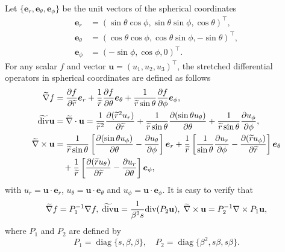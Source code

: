 \documentclass[11pt]{article}
\newcommand{\pa}{\partial}
\newcommand{\dive}{{\rm div}}
\newcommand{\wid}{\widetilde}
\newcommand{\bs}{\boldsymbol}
\providecommand{\Diag}{\operatorname{diag}}%
\begin{document}
Let $\{\bs e_r,\bs e_{\theta},\bs e_{\phi}\}$ be the unit vectors of the spherical coordinates
\begin{equation*}
\begin{aligned}
\bs{e}_{r} &=(\sin \theta \cos \phi, \sin \theta \sin \phi, \cos \theta)^\top, \\ 
\bs{e}_{\theta} &=(\cos \theta \cos \phi, \cos \theta \sin \phi,-\sin \theta)^\top, \\ 
\bs{e}_{\phi} &=(-\sin \phi, \cos \phi, 0)^\top.
\end{aligned}
\end{equation*}
For any scalar $f$ and vector $\mathbf{u}=(u_1,u_2,u_3)^{\top}$, the stretched differential 
operators in spherical coordinates are defined as follows
\begin{equation*}
\begin{aligned}
\wid{\nabla}f &=\frac{\pa f}{\pa \wid{r} }\bs{e}_r+\frac{1}{\wid{r}}\frac{\pa f}{\pa \theta }
\bs{e}_{\theta}+\frac{1}{\wid{r}\sin \theta}\frac{\pa f}{\pa \phi }\bs{e}_{\phi},\\
\wid{\dive}\mathbf{u} &=\wid{\nabla}\cdot\mathbf{u}=\frac{1}{\wid{r}^2}\frac{\pa(\wid{r}^2 u_r)}
{\pa \wid{r} }+\frac{1}{\wid{r}\sin\theta}\frac{\pa(\sin\theta u_{\theta})}{\pa \theta }
+\frac{1}{\wid{r}\sin \theta}\frac{\pa u_{\phi}}{\pa \phi },\\
\wid{\nabla}\times\mathbf{u} &=\frac{1}{ \wid{r}\sin\theta }\left[\frac{\pa(\sin\theta u_{\phi})}
{\pa \theta}-\frac{\pa u_{\theta}}{\pa \phi}\right]\bs{e}_r+\frac{1}{ \wid{r} }\left[\frac{1}{\sin\theta}
\frac{\pa u_{r}}{\pa \phi}-\frac{\pa( \wid{r}u_{\phi})}{\pa \wid{r}}\right]\bs{e}_{\theta}\\
&\quad+\frac{1}{ \wid{r} }\left[\frac{\pa( \wid{r}u_{\theta})}{\pa \wid{r}}-\frac{\pa u_{r}}
{\pa \theta}\right]\bs{e}_{\phi},
\end{aligned}
\end{equation*}
with $u_r=\mathbf{u}\cdot\bs e_r$, $u_{\theta}=\mathbf{u}\cdot\bs e_{\theta}$ and 
$u_{\phi}=\mathbf{u}\cdot\bs e_{\phi}$.
It is easy to verify that
\begin{equation}\label{relation_oper}
\wid{\nabla}f=P_1^{-1}\nabla f,\;\wid{\dive}\mathbf{u}=\frac{1}{\beta^2s}
\dive (P_2 \mathbf{u}),\;\wid{\nabla}\times\mathbf{u}=P_2^{-1}\nabla \times P_1\mathbf{u},
\end{equation}
where $P_1$ and $P_2$ are defined by
\begin{equation}\label{P1P2}
P_1=\Diag\{s,\beta,\beta\},\quad P_2=\Diag\{\beta^2,s\beta,s\beta\}.
\end{equation}
\end{document}
